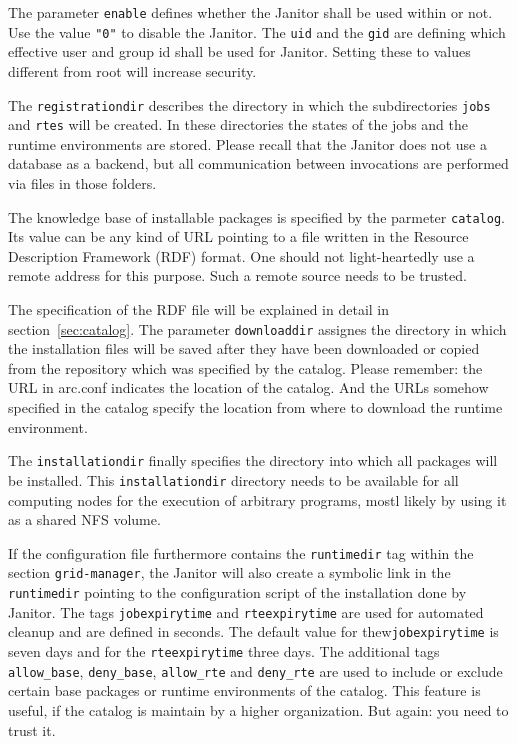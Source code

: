 The parameter \texttt{enable} defines whether the Janitor shall be
used within \AREX or not. Use the value \texttt{"0"} to disable the
Janitor. The \texttt{uid} and the \texttt{gid} are defining which
effective user and group id shall be used for Janitor. Setting these to
values different from root will increase security.

The \texttt{registrationdir} describes the directory in which
the subdirectories \texttt{jobs} and \texttt{rtes} will be created.
In these directories the states of the jobs and the runtime environments
are stored. Please recall that the Janitor does not use a database as
a backend, but all communication between invocations are performed via
files in those folders.

The knowledge base of installable packages is specified by the parmeter
\texttt{catalog}.  Its value can be any kind of URL pointing to a file
written in the Resource Description Framework (RDF) format. One should
not light-heartedly use a remote address for this purpose. Such a remote
source needs to be trusted.

The specification of the RDF file will be explained in detail in
section~\ref{sec:catalog}.  The parameter \texttt{downloaddir} assignes
the directory in which the installation files will be saved after they
have been downloaded or copied from the repository which was specified by
the catalog. Please remember: the URL in arc.conf indicates the location
of the catalog. And the URLs somehow specified in the catalog specify
the location from where to download the runtime environment.

The \texttt{installationdir} finally specifies the directory into which
all packages will be installed. This \texttt{installationdir} directory
needs to be available for all computing nodes for the execution of 
arbitrary programs, mostl likely by using it as a shared NFS volume.

If the configuration file furthermore contains the \texttt{runtimedir}
tag within the section \texttt{grid-manager}, the Janitor will
also create a symbolic link in the \texttt{runtimedir} pointing to
the configuration script of the installation done by Janitor. The
tags \texttt{jobexpirytime} and \texttt{rteexpirytime} are used
for automated cleanup and are defined in seconds.  The default
value for thew\texttt{jobexpirytime} is seven days and for
the \texttt{rteexpirytime} three days.  The additional tags
\texttt{allow\_base}, \texttt{deny\_base}, \texttt{allow\_rte} and
\texttt{deny\_rte} are used to include or exclude certain base packages
or runtime environments of the catalog. This feature is useful, if the
catalog is maintain by a higher organization. But again: you need to
trust it.

